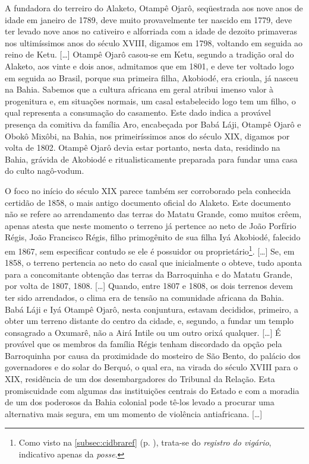 \begin{citacao}
A fundadora do terreiro do Alaketo, Otampê Ojarô, seqüestrada aos nove anos de idade em janeiro de 1789, deve muito provavelmente ter nascido em 1779, deve ter levado nove anos no cativeiro e alforriada com a idade de dezoito primaveras nos ultimíssimos anos do século XVIII, digamos em 1798, voltando em seguida ao reino de Ketu. [\dots] Otampê Ojarô casou-se em Ketu, segundo a tradição oral do Alaketo, aos vinte e dois anos, admitamos que em 1801, e deve ter voltado logo em seguida ao Brasil, porque sua primeira filha, Akobiodé, era crioula, já nasceu na Bahia. Sabemos que a cultura africana em geral atribui imenso valor à progenitura e, em situações normais, um casal estabelecido logo tem um filho, o qual representa a consumação do casamento. Este dado indica a provável presença da comitiva da família Aro, encabeçada por Babá Láji, Otampê Ojarô e Obokô Mixôbi, na Bahia, nos primeiríssimos anos do século XIX, digamos por volta de 1802. Otampê Ojarô devia estar portanto, nesta data, residindo na Bahia, grávida de Akobiodé e ritualisticamente preparada para fundar uma casa do culto nagô-vodum.

O foco no início do século XIX parece também ser corroborado pela conhecida certidão de 1858, o mais antigo documento oficial do Alaketo. Este documento não se refere ao arrendamento das terras do Matatu Grande, como muitos crêem, apenas atesta que neste momento o terreno já pertence ao neto de João Porfírio Régis, João Francisco Régis, filho primogênito de sua filha Iyá Akobiodé, falecido em 1867, sem especificar contudo se ele é possuidor ou proprietário\footnote{Como visto na \autoref{subsec:cidbraref} (p. \pageref{subsec:cidbraref}), trata-se do \textit{registro do vigário}, indicativo apenas da \textit{posse}.}. [\dots] Se, em 1858, o terreno pertencia ao neto do casal que inicialmente o obteve, tudo aponta para a concomitante obtenção das terras da Barroquinha e do Matatu Grande, por volta de 1807, 1808. [\dots] Quando, entre 1807 e 1808, os dois terrenos devem ter sido arrendados, o clima era de tensão na comunidade africana da Bahia. Babá Láji e Iyá Otampê Ojarô, nesta conjuntura, estavam decididos, primeiro, a obter um terreno distante do centro da cidade, e, segundo, a fundar um templo consagrado a Oxumarê, não a Airá Intile ou um outro orixá qualquer. [\dots] É provável que os membros da família Régis tenham discordado da opção pela Barroquinha por causa da proximidade do mosteiro de São Bento, do palácio dos governadores e do solar do Berquó, o qual era, na virada do século XVIII para o XIX, residência de um dos desembargadores do Tribunal da Relação. Esta promiscuidade com algumas das instituições centrais do Estado e com a moradia de um dos poderosos da Bahia colonial pode tê-los levado a procurar uma alternativa mais segura, em um momento de violência antiafricana. [\dots]


\end{citacao}

